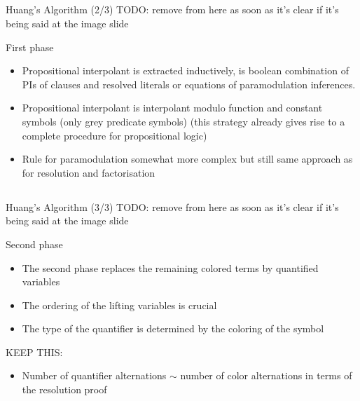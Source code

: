 \documentclass[final,compress]{beamer}
\begin{document}
\subsection{}
\begin{frame}{Huang's Algorithm (2/3)}
	TODO: remove from here as soon as it's clear if it's being said at the image slide
	\begin{block}{First phase}
		\begin{itemize}
			\item Propositional interpolant is extracted inductively, is boolean combination of PIs of clauses and resolved literals or equations of paramodulation inferences.
			\item Propositional interpolant is interpolant modulo function and constant symbols (only grey predicate symbols) (this strategy already gives rise to a complete procedure for propositional logic)
			\item Rule for paramodulation somewhat more complex but still same approach as for resolution and factorisation
		\end{itemize}
	\end{block}
\end{frame}

\subsection{}
\begin{frame}{Huang's Algorithm (3/3)}
	TODO: remove from here as soon as it's clear if it's being said at the image slide
	\begin{block}{Second phase}
		\begin{itemize}
			\item The second phase replaces the remaining colored terms by quantified variables
			\item The ordering of the lifting variables is crucial
			\item The type of the quantifier is determined by the coloring of the symbol
		\end{itemize}
	\end{block}

	\pause

	KEEP THIS:

	\begin{itemize}
			\item Number of quantifier alternations $\sim$ number of color alternations in terms of the resolution proof
	\end{itemize}

\end{frame}
\end{document}
